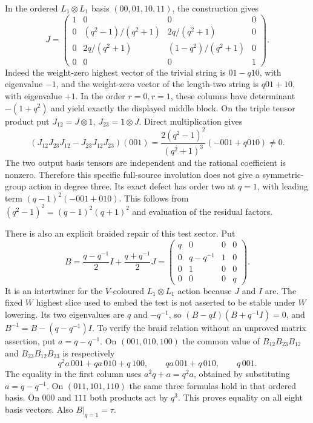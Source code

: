 In the ordered $L_1\otimes L_1$ basis
$(00,01,10,11)$, the construction gives
\begin{equation}\label{eq:qt-small-commutor}
 J=\begin{pmatrix}
 1&0&0&0\\
 0&(q^2-1)/(q^2+1)&2q/(q^2+1)&0\\
 0&2q/(q^2+1)&(1-q^2)/(q^2+1)&0\\
 0&0&0&1
 \end{pmatrix}.
\end{equation}
Indeed the weight-zero highest vector of the trivial string is
$01-q10$, with eigenvalue $-1$, and the weight-zero vector of
the length-two string is $q01+10$, with eigenvalue $+1$.
In the order $r=0,r=1$, these columns have determinant $-(1+q^2)$ and yield exactly
the displayed middle block. On the triple tensor product put
$J_{12}=J\otimes1$, $J_{23}=1\otimes J$. Direct multiplication gives
\begin{equation}\label{eq:qt-braid-defect}
 (J_{12}J_{23}J_{12}-J_{23}J_{12}J_{23})(001)
 =\frac{2(q^2-1)^2}{(q^2+1)^3}(-001+q010)\ne0.
\end{equation}
The two output basis tensors are independent and the rational
coefficient is nonzero. Therefore this specific full-source
involution does not give a symmetric-group action in degree three.
Its exact defect has order two at $q=1$, with leading term
$(q-1)^2(-001+010)$. This follows from
$(q^2-1)^2=(q-1)^2(q+1)^2$ and evaluation of the residual factors.

There is also an explicit braided repair of this test sector. Put
\[
 B=\frac{q-q^{-1}}2 I+\frac{q+q^{-1}}2 J
 =\begin{pmatrix}
 q&0&0&0\\0&q-q^{-1}&1&0\\0&1&0&0\\0&0&0&q
 \end{pmatrix}.
\]
It is an intertwiner for the $V$-coloured $L_1\otimes L_1$ action
because $J$ and $I$ are. The fixed $W$ highest slice used to embed
the test is not asserted to be stable under $W$ lowering.
Its two eigenvalues
are $q$ and $-q^{-1}$, so
$(B-qI)(B+q^{-1}I)=0$, and
$B^{-1}=B-(q-q^{-1})I$. To verify the braid relation without an
unproved matrix assertion, put $a=q-q^{-1}$. On
$(001,010,100)$ the common value of
$B_{12}B_{23}B_{12}$ and $B_{23}B_{12}B_{23}$ is respectively
\[
 q^2a\,001+qa\,010+q\,100,\qquad
 qa\,001+q\,010,\qquad q\,001.
\]
The equality in the first column uses $a^2q+a=q^2a$, obtained
by substituting $a=q-q^{-1}$. On $(011,101,110)$ the same three
formulas hold in that ordered basis. On $000$ and $111$ both
products act by $q^3$. This proves equality on all eight basis
vectors. Also $B|_{q=1}=\tau$.

